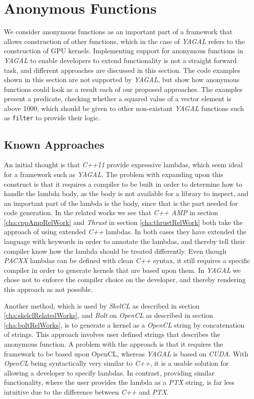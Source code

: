 \section{Anonymous Functions}
We consider anonymous functions as an important part of a framework that allows construction of other functions, which in the case of \textit{YAGAL} refers to the construction of GPU kernels. Implementing support for anonymous functions in \textit{YAGAL} to enable developers to extend functionality is not a straight forward task, and different approaches are discussed in this section. The code examples shown in this section are not supported by \textit{YAGAL}, but show how anonymous functions could look as a result each of our proposed approaches. The examples present a predicate, checking whether a squared value of a vector element is above 1000, which should be given to other non-existant \textit{YAGAL} functions such as \texttt{filter} to provide their logic.

\subsection{Known Approaches}
An initial thought is that \textit{C++11} provide expressive lambdas, which seem ideal for a framework such as \textit{YAGAL}. The problem with expanding upon this construct is that it requires a compiler to be built in order to determine how to handle the lambda body, as the body is not available for a library to inspect\cite{cppLambdaRef}, and an important part of the lambda is the body, since that is the part needed for code generation. In the related works we see that \textit{C++ AMP} in section \ref{cha:cppAmpRelWork} and \textit{Thrust} in section \ref{cha:thrustRelWork} both take the approach of using extended \textit{C++} lambdas. In both cases they have extended the language with keywords in order to annotate the lambdas, and thereby tell their compiler know how the lambda should be treated differently. Even though \textit{PACXX} lambdas can be defined with clean \textit{C++} syntax, it still requires a specific compiler in order to generate kernels that are based upon them. In \textit{YAGAL} we chose not to enforce the compiler choice on the developer, and thereby rendering this approach as not possible.

Another method, which is used by \textit{SkelCL} as described in section \ref{cha:skelclRelatedWorks}, and \textit{Bolt} on \textit{OpenCL} as described in section \ref{cha:boltRelWorks}, is to generate a kernel as a \textit{OpenCL} string by concatenation of strings. This approach involves user defined strings that describes the anonymous function. A problem with the approach is that it requires the framework to be based upon OpenCL, whereas \textit{YAGAL} is based on \textit{CUDA}. With \textit{OpenCL} being syntactically very similar to \textit{C++}, it is a usable solution for allowing a developer to specify lambdas. In contrast, providing similar functionality, where the user provides the lambda as a \textit{PTX} string, is far less intuitive due to the difference between \textit{C++} and \textit{PTX}.

